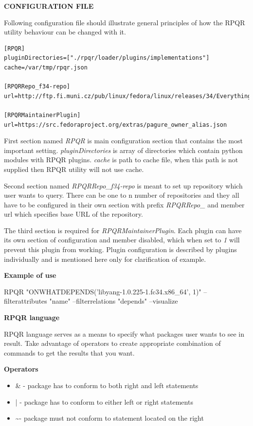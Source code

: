 \textbf{CONFIGURATION FILE}

Following configuration file should illustrate general principles of how the RPQR utility behaviour
can be changed with it.

\begin{lstlisting}
[RPQR]
pluginDirectories=["./rpqr/loader/plugins/implementations"]
cache=/var/tmp/rpqr.json

[RPQRRepo_f34-repo]
url=http://ftp.fi.muni.cz/pub/linux/fedora/linux/releases/34/Everything/x86_64/os/

[RPQRMaintainerPlugin]
url=https://src.fedoraproject.org/extras/pagure_owner_alias.json
\end{lstlisting}

First section named \textit{RPQR} is main configuration section that contains the most important
setting. \textit{pluginDirectories} is array of directories which contain python modules with RPQR
plugins. \textit{cache} is path to cache file, when this path is not supplied then RPQR utility
will not use cache.

Second section named \textit{RPQRRepo\_f34-repo} is meant to set up repository which user wants to
query. There can be one to n number of repositories and they all have to be configured in their own
section with prefix \textit{RPQRRepo\_} and member url which specifies base URL of the repository.

The third section is required for \textit{RPQRMaintainerPlugin}. Each plugin can have its own section
of configuration and member disabled, which when set to \textit{1} will prevent this plugin from
working. Plugin configuration is described by plugins individually and is mentioned here only for
clarification of example.

\textbf{Example of use}

RPQR "ONWHATDEPENDS('libyang-1.0.225-1.fc34.x86\_64', 1)" --filterattributes "name" --filterrelations "depends" --visualize

\textbf{RPQR language}

RPQR language serves as a means to specify what packages user wants to see in result. Take advantage
of operators to create appropriate combination of commands to get the results that you want.

\textbf{Operators}

\begin{itemize}
  \item \& - package has to conform to both right and left statements
  \item  | - package has to conform to either left or right statements
  \item  \textasciitilde - package must not conform to statement located on the right 
\end{itemize}

